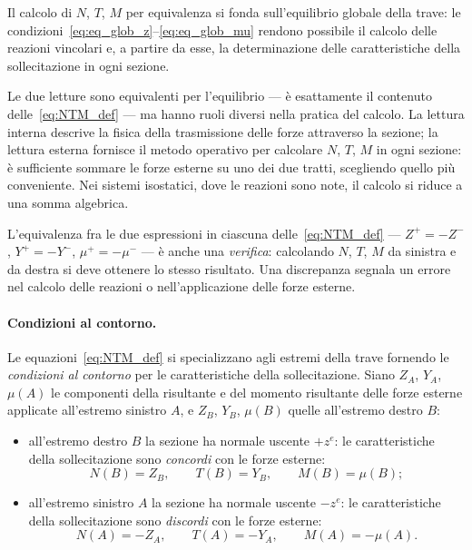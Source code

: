\begin{oss}
	Il calcolo di $N$, $T$, $M$ per equivalenza
	si fonda sull'equilibrio globale della trave:
	le condizioni~\eqref{eq:eq_glob_z}--\eqref{eq:eq_glob_mu}
	rendono possibile il calcolo delle reazioni
	vincolari e, a partire da esse, la determinazione
	delle caratteristiche della sollecitazione
	in ogni sezione.
\end{oss}

\begin{oss}
	Le due letture sono equivalenti per l'equilibrio
	--- è esattamente il contenuto
	delle~\eqref{eq:NTM_def} --- ma hanno ruoli
	diversi nella pratica del calcolo. La lettura
	interna descrive la fisica della trasmissione
	delle forze attraverso la sezione; la lettura
	esterna fornisce il metodo operativo per
	calcolare $N$, $T$, $M$ in ogni sezione:
	è sufficiente sommare le forze esterne su uno
	dei due tratti, scegliendo quello più conveniente.
	Nei sistemi isostatici, dove le reazioni sono
	note, il calcolo si riduce a una somma algebrica.
\end{oss}

\begin{oss}
	L'equivalenza fra le due espressioni in
	ciascuna delle~\eqref{eq:NTM_def} --- 
	$Z^+ = -Z^-$, $Y^+ = -Y^-$, $\mu^+ = -\mu^-$
	--- è anche una \emph{verifica}: calcolando
	$N$, $T$, $M$ da sinistra e da destra si deve
	ottenere lo stesso risultato. Una discrepanza
	segnala un errore nel calcolo delle reazioni
	o nell'applicazione delle forze esterne.
\end{oss}


\paragraph{Condizioni al contorno.}
Le equazioni~\eqref{eq:NTM_def} si specializzano
agli estremi della trave fornendo le
\emph{condizioni al contorno} per le caratteristiche
della sollecitazione. Siano $Z_A$, $Y_A$, $\mu(A)$
le componenti della risultante e del momento
risultante delle forze esterne applicate
all'estremo sinistro $A$, e $Z_B$, $Y_B$, $\mu(B)$
quelle all'estremo destro $B$:
\begin{itemize}[nosep]
	\item all'estremo destro $B$ la sezione ha
	normale uscente $+z^e$: le caratteristiche
	della sollecitazione sono \emph{concordi} con
	le forze esterne:
	\begin{equation}\label{eq:cc_destra}
		N(B) = Z_B, \qquad
		T(B) = Y_B, \qquad
		M(B) = \mu(B);
	\end{equation}
	\item all'estremo sinistro $A$ la sezione ha
	normale uscente $-z^e$: le caratteristiche
	della sollecitazione sono \emph{discordi} con
	le forze esterne:
	\begin{equation}\label{eq:cc_sinistra}
		N(A) = -Z_A, \qquad
		T(A) = -Y_A, \qquad
		M(A) = -\mu(A).
	\end{equation}
\end{itemize}

